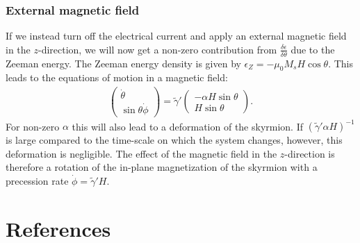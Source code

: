 \documentclass[1p]{elsarticle}		%
\numberwithin{equation}{section}
\begin{document}
\subsubsection{External magnetic field}
If we instead turn off the electrical current and apply an external magnetic field in the $z$-direction, we will now get a non-zero contribution from $\frac{\delta\epsilon}{\delta\theta}$ due to the Zeeman energy. The Zeeman energy density is given by $\epsilon_Z = -\mu_0M_sH\cos\theta$. This leads to the equations of motion in a magnetic field:
\begin{align}
\nonumber \begin{pmatrix}
\dot{\theta} \\ \sin\theta\dot{\phi}
\end{pmatrix} =
\tilde{\gamma}'
\begin{pmatrix}
-\alpha H\sin\theta \\ H\sin\theta
\end{pmatrix}.
\label{eq:LLG_skyrmion_Hz}
\end{align}
For non-zero $\alpha$ this will also lead to a deformation of the skyrmion. If $(\tilde{\gamma}'\alpha H)^{-1}$ is large compared to the time-scale on which the system changes, however, this deformation is negligible. The effect of the magnetic field in the $z$-direction is therefore a rotation of the in-plane magnetization of the skyrmion with a precession rate $\dot{\phi} = \tilde{\gamma}'H$.
\section{References}


\end{document}
